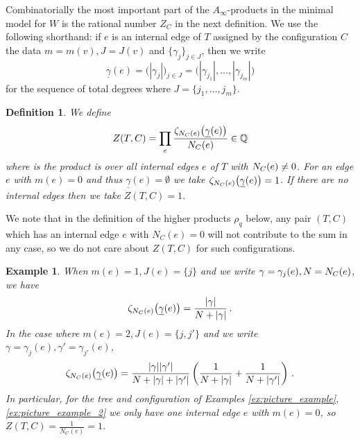 \documentclass[english,letter paper,12pt,leqno]{article}
\theoremstyle{example}
\newtheorem{definition}[theorem]{Definition}
\newtheorem{example}[theorem]{Example}
\numberwithin{equation}{section}
\def\be{\begin{equation}}
\def\ee{\end{equation}}
\begin{document}
Combinatorially the most important part of the $A_\infty$-products in the minimal model for $W$ is the rational number $Z_C$ in the next definition. We use the following shorthand: if $e$ is an internal edge of $T$ assigned by the configuration $C$ the data $m = m(v), J = J(v)$ and $\{ \gamma_j \}_{j \in J}$, then we write
\be
\underline{\gamma}(e) = \big( |\gamma_j| \big)_{j \in J} = \big( |\gamma_{j_1}|, \ldots, |\gamma_{j_m}| \big)
\ee
for the sequence of total degrees where $J = \{j_1,\ldots,j_m\}$. 

\begin{definition} We define
\begin{gather*}
Z(T,C) = \prod_{e} \frac{ \zeta_{N_C(e)}\big( \underline{\gamma}(e) \big)}{ N_C(e) } \in \mathbb{Q}
\end{gather*}
where is the product is over all internal edges $e$ of $T$ with $N_C(e) \neq 0$. For an edge $e$ with $m(e) = 0$ and thus $\underline{\gamma}(e) = \emptyset$ we take $\zeta_{N_C(e)}\big( \underline{\gamma}(e) \big) = 1$. If there are no internal edges then we take $Z(T,C) = 1$.
\end{definition}

We note that in the definition of the higher products $\rho_q$ below, any pair $(T,C)$ which has an internal edge $e$ with $N_C(e) = 0$ will not contribute to the sum in any case, so we do not care about $Z(T,C)$ for such configurations.

\begin{example} When $m(e) = 1, J(e) = \{ j \}$ and we write $\gamma = \gamma_j(e), N = N_C(e)$, we have
\[
\zeta_{N_C(e)}\big( \underline{\gamma}(e) \big) = \frac{|\gamma|}{N + |\gamma|}\,.
\]
In the case where $m(e) = 2, J(e) = \{ j, j' \}$ and we write $\gamma = \gamma_j(e), \gamma' = \gamma_{j'}(e)$,
\[
\zeta_{N_C(e)}\big( \underline{\gamma}(e) \big) = \frac{|\gamma||\gamma'|}{N + |\gamma| + |\gamma'|} \left( \frac{1}{N + |\gamma|}  + \frac{1}{N + |\gamma'|}\right)\,.
\]
In particular, for the tree and configuration of Examples \ref{ex:picture_example}, \ref{ex:picture_example_2} we only have one internal edge $e$ with $m(e) = 0$, so $Z(T,C) = \frac{1}{N_C(e)} = 1$.
\end{example}
\end{document}
